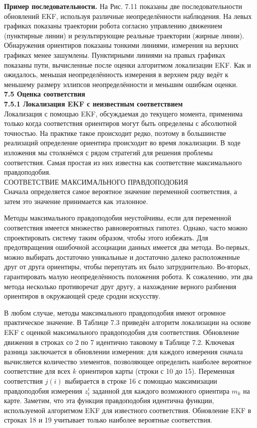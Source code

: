 \documentclass[10pt,a4paper]{article}
\begin{document}
\textbf{Пример последовательности.} На Рис. 7.11 показаны две последовательности обновлений EKF, используя различные неопределённости наблюдения. На левых графиках показаны траектории робота согласно управлению движением (пунктирные линии) и результирующие реальные траектории (жирные линии). Обнаружения ориентиров показаны тонкими линиями, измерения на верхних графиках менее зашумлены. Пунктирными линиями на правых графиках показаны пути, вычисленные после оценки алгоритмом локализации EKF. Как и ожидалось, меньшая неопределённость измерения в верхнем ряду ведёт к меньшему размеру эллипсов неопределённости и меньшим ошибкам оценки.\\

\textbf{7.5 Оценка соответствия}\\

\textbf{7.5.1 Локализация EKF с неизвестным соответствием}\\

Локализация с помощью EKF, обсуждаемая до текущего момента, применима только когда соответствия ориентиров могут быть определены с абсолютной точностью. На практике такое происходит редко, поэтому в большинстве реализаций определение ориентира происходит во время локализации. В ходе изложения мы столкнёмся с рядом стратегий для решения проблемы соответствия. Самая простая из них известна как соответствие максимального правдоподобия.\\
СООТВЕТСТВИЕ МАКСИМАЛЬНОГО ПРАВДОПОДОБИЯ\\
Сначала определяется самое вероятное значение переменной соответствия, а затем это значение принимается как эталонное. 

Методы максимального правдоподобия неустойчивы, если для переменной соответствия имеется множество равновероятных гипотез. Однако, часто можно спроектировать систему таким образом, чтобы этого избежать. Для предотвращения ошибочной ассоциации данных имеется два метода. Во-первых, можно выбирать достаточно уникальные и достаточно далеко расположенные друг от друга ориентиры, чтобы перепутать их было затруднительно. Во-вторых, гарантировать малую неопределённость положения робота. К сожалению, эти два метода несколько противоречат друг другу, а нахождение верного разбиения ориентиров в окружающей среде сродни искусству. 

В любом случае, методы максимального правдоподобия имеют огромное практическое значение. В Таблице 7.3 приведён алгоритм локализации на основе EKF с оценкой максимального правдоподобия для соответствия. Обновление движения в строках со 2 по 7 идентично таковому в Таблице 7.2. Ключевая разница заключается в обновлении измерения: для каждого измерения сначала вычисляется количество элементов, позволяющее определить наиболее вероятное соответствие для всех $k$ ориентиров карты (строки с 10 до 15). Переменная соответствия $j(i)$ выбирается в строке 16 с помощью максимизации правдоподобия измерения $z^i_t$ заданной для каждого возможного ориентира $m_k$ на карте. Заметим, что эта функция правдоподобия идентична функции, используемой алгоритмом EKF для известного соответствия. Обновление EKF в строках 18 и 19 учитывает только наиболее вероятные соответствия.
\end{document}
